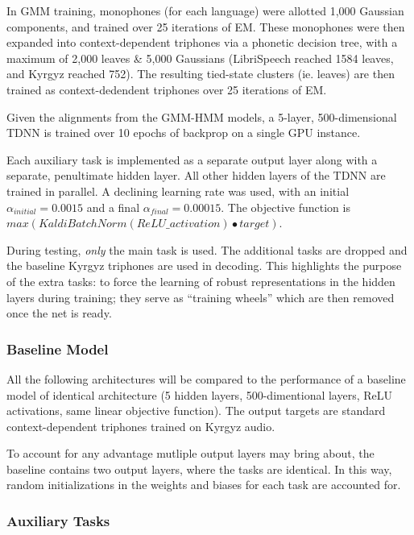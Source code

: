 \documentclass[a4paper]{article}
\begin{document}
In GMM training, monophones (for each language) were allotted 1,000 Gaussian components, and trained over 25 iterations of EM. These monophones were then expanded into context-dependent triphones via a phonetic decision tree, with a maximum of 2,000 leaves \& 5,000 Gaussians (LibriSpeech reached 1584 leaves, and Kyrgyz reached 752). The resulting tied-state clusters (ie. leaves) are then trained as context-dedendent triphones over 25 iterations of EM.

Given the alignments from the GMM-HMM models, a 5-layer, 500-dimensional TDNN is trained over 10 epochs of backprop on a single GPU instance.

Each auxiliary task is implemented as a separate output layer along with a separate, penultimate hidden layer. All other hidden layers of the TDNN are trained in parallel. A declining learning rate was used, with an initial $\alpha_{initial}=0.0015$ and a final $\alpha_{final}=0.00015$. The objective function is $max( KaldiBatchNorm(ReLU\_activation) \bullet target )$.

During testing, \textit{only} the main task is used. The additional tasks are dropped and the baseline Kyrgyz triphones are used in decoding. This highlights the purpose of the extra tasks: to force the learning of robust representations in the hidden layers during training; they serve as ``training wheels'' which are then removed once the net is ready.



\subsubsection{Baseline Model}

All the following architectures will be compared to the performance of a baseline model of identical architecture (5 hidden layers, 500-dimentional layers, ReLU activations, same linear objective function). The output targets are standard context-dependent triphones trained on Kyrgyz audio.

To account for any advantage mutliple output layers may bring about, the baseline contains two output layers, where the tasks are identical. In this way, random initializations in the weights and biases for each task are accounted for.

\subsubsection{Auxiliary Tasks}
\end{document}
